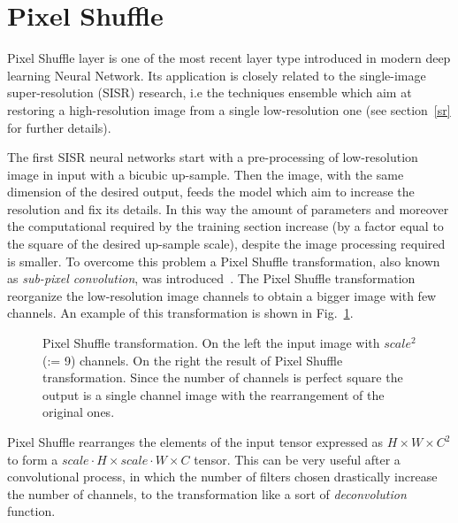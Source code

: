 \documentclass{standalone}
\begin{document}

\section[Pixel Shuffle]{Pixel Shuffle}\label{shuffler}

Pixel Shuffle layer is one of the most recent layer type introduced in modern deep learning Neural Network.
Its application is closely related to the single-image super-resolution (SISR) research, i.e the techniques ensemble which aim at restoring a high-resolution image from a single low-resolution one (see section~\ref{sr} for further details).

The first SISR neural networks start with a pre-processing of low-resolution image in input with a bicubic up-sample.
Then the image, with the same dimension of the desired output, feeds the model which aim to increase the resolution and fix its details.
In this way the amount of parameters and moreover the computational required by the training section increase (by a factor equal to the square of the desired up-sample scale), despite the image processing required is smaller.
To overcome this problem a Pixel Shuffle transformation, also known as \emph{sub-pixel convolution}, was introduced~\cite{Wenzhe2016Shuffle}.
The Pixel Shuffle transformation reorganize the low-resolution image channels to obtain a bigger image with few channels.
An example of this transformation is shown in Fig.~\ref{fig:pixel_shuffle}.

\begin{figure}[htbp]
\centering
\def\svgwidth{0.7\textwidth}

\caption{Pixel Shuffle transformation.
On the left the input image with $scale^2$ (:= 9) channels.
On the right the result of Pixel Shuffle transformation.
Since the number of channels is perfect square the output is a single channel image with the rearrangement of the original ones.
}
\label{fig:pixel_shuffle}
\end{figure}

Pixel Shuffle rearranges the elements of the input tensor expressed as $H \times W \times C^2$ to form a $scale \cdot H \times scale \cdot W \times C$ tensor.
This can be very useful after a convolutional process, in which the number of filters chosen drastically increase the number of channels, to  the transformation like a sort of \emph{deconvolution} function.
\end{document}
